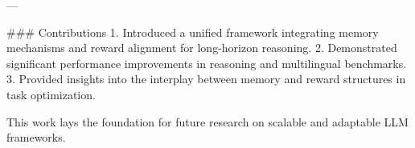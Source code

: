 ---

### Contributions
1. Introduced a unified framework integrating memory mechanisms and reward alignment for long-horizon reasoning.
2. Demonstrated significant performance improvements in reasoning and multilingual benchmarks.
3. Provided insights into the interplay between memory and reward structures in task optimization.

This work lays the foundation for future research on scalable and adaptable LLM frameworks.